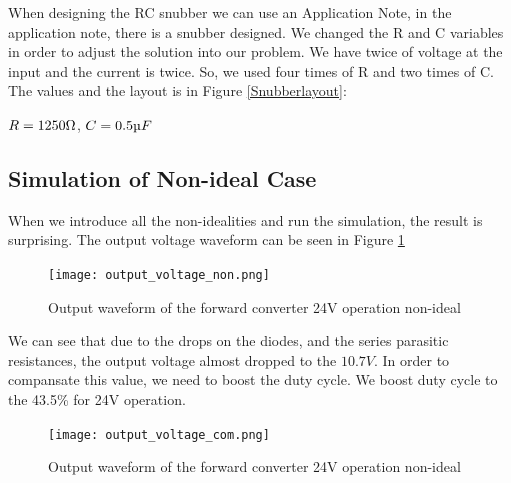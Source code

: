 When designing the RC snubber we can use an Application Note, in the application note, there is a snubber designed. We changed the R and C variables in order to adjust the solution into our problem. We have twice of voltage at the input and the current is twice. So, we used four times of R and two times of C. The values and the layout is in Figure \ref{Snubberlayout}:

$ R = 1250 \ohm$, $C=0.5 \micro F$


\subsection{Simulation of Non-ideal Case}

When we introduce all the non-idealities and run the simulation, the result is surprising. The output voltage waveform can be seen in Figure \ref{Output24non}

\begin{center}
\begin{figure}[H]
\centering
\texttt{[image: output\_voltage\_non.png]}
\caption{Output waveform of the forward converter 24V operation non-ideal}
\label{Output24non}
\end{figure}
\end{center}

We can see that due to the drops on the diodes, and the series parasitic resistances, the output voltage almost dropped to the $10.7V$. In order to compansate this value, we need to boost the duty cycle. We boost duty cycle to the 43.5\% for 24V operation.

\begin{center}
\begin{figure}[H]
\centering
\texttt{[image: output\_voltage\_com.png]}
\caption{Output waveform of the forward converter 24V operation non-ideal}
\label{Output24com}
\end{figure}
\end{center}

